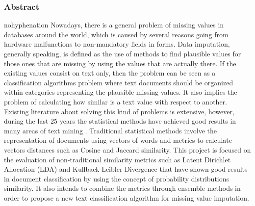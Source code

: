 \subsubsection{Abstract}
\begin{hyphenrules}{nohyphenation}
Nowadays, there is a general problem of missing values in databases around the world, which is caused by several reasons going from hardware malfunctions to non-mandatory fields in forms. Data imputation, generally speaking, is defined as the use of methods to find plausible values for those ones that are missing by using the values that are actually there. If the existing values consist on text only, then the problem can be seen as a classification algorithms problem where text documents should be organized within categories representing the plausible missing values. It also implies the problem of calculating how similar is a text value with respect to another. Existing literature about solving this kind of problems is extensive, however, during the last 25 years the statistical methods have achieved good results in many areas of text mining \cite{srivastava2009text}. Traditional statistical methods involve the representation of documents using vectors of words and metrics to calculate vectors distances such as Cosine and Jaccard similarity. This project is focused on the evaluation of non-traditional similarity metrics such as Latent Dirichlet Allocation (LDA) and Kullback-Leibler Divergence that have shown good results in document classification by using the concept of probability distributions similarity. It also intends to combine the metrics through ensemble methods in order to propose a new text classification algorithm for missing value imputation.
\end{hyphenrules}


